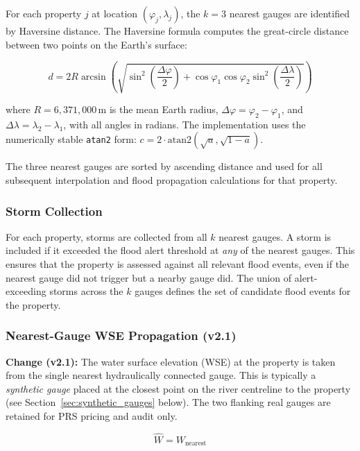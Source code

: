 \documentclass[11pt,a4paper]{article}
\begin{document}
For each property $j$ at location $(\varphi_j, \lambda_j)$, the $k = 3$ nearest
gauges are identified by Haversine distance. The Haversine formula computes the
great-circle distance between two points on the Earth's surface:

\begin{equation}
    d = 2R \arcsin\!\left(\sqrt{\sin^2\!\left(\frac{\Delta\varphi}{2}\right) +
    \cos\varphi_1 \cos\varphi_2 \sin^2\!\left(\frac{\Delta\lambda}{2}\right)}\right)
    \label{eq:haversine}
\end{equation}

\noindent where $R = 6{,}371{,}000\,$m is the mean Earth radius,
$\Delta\varphi = \varphi_2 - \varphi_1$, and
$\Delta\lambda = \lambda_2 - \lambda_1$, with all angles in radians. The
implementation uses the numerically stable \texttt{atan2} form:
$c = 2 \cdot \text{atan2}(\sqrt{a}, \sqrt{1-a})$.

The three nearest gauges are sorted by ascending distance and used for all
subsequent interpolation and flood propagation calculations for that property.

\subsubsection{Storm Collection}

For each property, storms are collected from all $k$ nearest gauges. A storm is
included if it exceeded the flood alert threshold at \emph{any} of the nearest
gauges. This ensures that the property is assessed against all relevant flood events,
even if the nearest gauge did not trigger but a nearby gauge did. The union of
alert-exceeding storms across the $k$ gauges defines the set of candidate flood
events for the property.

\subsubsection{Nearest-Gauge WSE Propagation (v2.1)}

\textbf{Change (v2.1):} The water surface elevation (WSE) at the property is taken from
the single nearest hydraulically connected gauge. This is typically a \emph{synthetic
gauge} placed at the closest point on the river centreline to the property (see
Section~\ref{sec:synthetic_gauges} below). The two flanking real gauges are retained
for PRS pricing and audit only.

\begin{equation}
    \hat{W} = W_{\text{nearest}}
    \label{eq:nearest_wse}
\end{equation}
\end{document}

